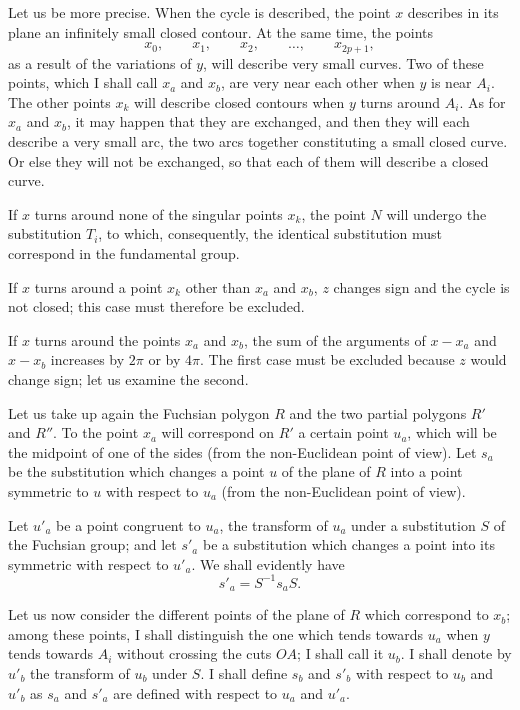 \documentclass{article}
\begin{document}
Let us be more precise. When the cycle is described, the point $x$ describes in its plane an infinitely small closed contour. At the same time, the points
\[ x_{0}, \qquad x_{1}, \qquad x_{2}, \qquad \ldots, \qquad x_{2p+1}, \]
as a result of the variations of $y$, will describe very small curves. Two of these points, which I shall call $x_{a}$ and $x_{b}$, are very near each other when $y$ is near $A_{i}$. The other points $x_{k}$ will describe closed contours when $y$ turns around $A_{i}$. As for $x_{a}$ and $x_{b}$, it may happen that they are exchanged, and then they will each describe a very small arc, the two arcs together constituting a small closed curve. Or else they will not be exchanged, so that each of them will describe a closed curve.


If $x$ turns around none of the singular points $x_{k}$, the point $N$ will undergo the substitution $T_{i}$, to which, consequently, the identical substitution must correspond in the fundamental group.

If $x$ turns around a point $x_{k}$ other than $x_{a}$ and $x_{b}$, $z$ changes sign and the cycle is not closed; this case must therefore be excluded.

If $x$ turns around the points $x_{a}$ and $x_{b}$, the sum of the arguments of $x - x_{a}$ and $x - x_{b}$ increases by $2\pi$ or by $4\pi$. The first case must be excluded because $z$ would change sign; let us examine the second.

Let us take up again the Fuchsian polygon $R$ and the two partial polygons $R'$ and $R''$. To the point $x_{a}$ will correspond on $R'$ a certain point $u_{a}$, which will be the midpoint of one of the sides (from the non-Euclidean point of view). Let $s_{a}$ be the substitution which changes a point $u$ of the plane of $R$ into a point symmetric to $u$ with respect to $u_{a}$ (from the non-Euclidean point of view).

Let $u'_{a}$ be a point congruent to $u_{a}$, the transform of $u_{a}$ under a substitution $S$ of the Fuchsian group; and let $s'_{a}$ be a substitution which changes a point into its symmetric with respect to $u'_{a}$. We shall evidently have
\[ s'_{a} = S^{-1} s_{a} S. \]

Let us now consider the different points of the plane of $R$ which correspond to $x_{b}$; among these points, I shall distinguish the one which tends towards $u_{a}$ when $y$ tends towards $A_{i}$ without crossing the cuts $OA$; I shall call it $u_{b}$. I shall denote by $u'_{b}$ the transform of $u_{b}$ under $S$. I shall define $s_{b}$ and $s'_{b}$ with respect to $u_{b}$ and $u'_{b}$ as $s_{a}$ and $s'_{a}$ are defined with respect to $u_{a}$ and $u'_{a}$.
\end{document}
